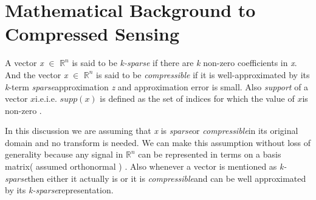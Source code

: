 \documentclass[12pt]{article}
\theoremstyle{definition}
\newtheorem{defn}{Definition}[section]
\def\compressible{\textit{compressible}\hspace{0.1in}}
\def\sparse{\textit{sparse}\hspace{0.1in}}
\def\ksparse{\textit{k-sparse}\hspace{0.1in}}
\def\x{$x$\hspace{0.1in}}
\begin{document}
\section{Mathematical Background to Compressed Sensing}
% 
 A vector \textit{x} $\in$ $\mathbb{R}^n$ is said to be \textit{k-sparse} if there are \textit{k} 
 non-zero coefficients in \textit{x}. 
 And the vector \textit{x} $\in$ $\mathbb{R}^n$ is said to be \textit{compressible} if it is well-approximated by its
\textit{k}-term \sparse approximation \textit{z} and approximation error is small. Also
\textit{support} of a vector \x i.e.i.e. $supp(x)$ is defined as the set of indices for which the value of \x is
non-zero \cite{CS_book}.

In this discussion we are assuming that \textit{x} is \sparse or \compressible in its original domain and no transform
is needed. We can make this assumption without loss of generality because any signal in $\mathbb{R}^n$ can be 
represented in terms on a basis matrix( assumed orthonormal ) \cite{Baraniuk-CS}.
Also whenever a vector is mentioned as \ksparse then either it actually is or it is \compressible and can be well approximated 
by its \ksparse representation.
\end{document}
